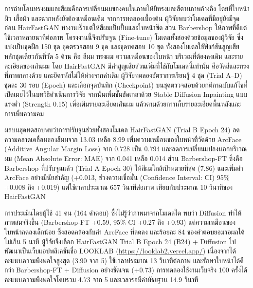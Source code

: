 การถ่ายโอนทรงผมและสีผมคือการเปลี่ยนผมของคนในภาพให้มีทรงและสีตามภาพอ้างอิง
โดยที่ใบหน้า ผิว เสื้อผ้า และฉากหลังยังต้องเหมือนเดิม
จากการทดลองเบื้องต้น ผู้วิจัยพบว่าโมเดลที่มีอยู่ยังมีจุดอ่อน
HairFastGAN ทำงานเร็วแต่ให้สีผมเป็นปื้นและใบหน้าซีด ส่วน Barbershop ให้ภาพที่ดีแต่ใช้เวลาหลายนาทีต่อภาพ
โครงงานนี้จึงปรับจูน (Fine-tune) โมเดลทั้งสองด้วยข้อมูลของผู้วิจัย
ซึ่งแบ่งเป็นชุดฝึก 150 ชุด ชุดตรวจสอบ 9 ชุด และชุดทดสอบ 10 ชุด
ทั้งสองโมเดลใช้ฟังก์ชันสูญเสียหลักชุดเดียวกันที่วัด 5 ด้าน คือ สีผม ทรงผม ความเหมือนของใบหน้า บริเวณที่ต้องคงเดิม และรายละเอียดของเส้นผม
โดย HairFastGAN มีค่าสูญเสียส่วนเพิ่มที่ใช้กับโมเดลนี้เท่านั้น คือวัดสีและทรงที่ภาพกลางด้วย และยึดรหัสไม่ให้ห่างจากค่าเดิม
ผู้วิจัยทดลองอัตราการเรียนรู้ 4 ชุด (Trial A--D) ชุดละ 30 รอบ (Epoch)
และเลือกจุดบันทึก (Checkpoint) บนชุดตรวจสอบด้วยกติกาฉบับแก้ไขที่เปิดเผยไว้ในบทวิธีดำเนินการวิจัย
จากนั้นเพิ่มขั้นขัดเกลาด้วย Stable Diffusion Inpainting แบบแรงต่ำ (Strength 0.15)
เพื่อเติมรายละเอียดเส้นผม แล้วตามด้วยการเก็บรายละเอียดพื้นหลังและการเพิ่มความคม

ผลบนชุดทดสอบพบว่าการปรับจูนช่วยทั้งสองโมเดล
HairFastGAN (Trial B Epoch 24) ลดความคลาดเคลื่อนของสีผมจาก 13.03 เหลือ 8.99
เพิ่มความเหมือนของใบหน้าที่วัดด้วย ArcFace (Additive Angular Margin Loss) จาก 0.728 เป็น 0.794
และลดการเปลี่ยนแปลงนอกบริเวณผม (Mean Absolute Error: MAE) จาก 0.041 เหลือ 0.014
ส่วน Barbershop-FT ซึ่งคือ Barbershop ที่ปรับจูนแล้ว (Trial A Epoch 30) ให้สีผมใกล้เป้าหมายที่สุด (7.86)
และเพิ่มค่า ArcFace อย่างมีนัยสำคัญ (+0.013, ช่วงความเชื่อมั่น (Confidence Interval: CI) 95\% +0.008 ถึง +0.019)
แต่ใช้เวลาประมาณ 657 วินาทีต่อภาพ เทียบกับประมาณ 10 วินาทีของ HairFastGAN

การประเมินโดยผู้ใช้ 41 คน (164 คำตอบ) ซึ่งไม่รู้ว่าภาพมาจากโมเดลใด พบว่า
Diffusion ทำให้ภาพสมจริงขึ้น (Barbershop-FT +0.59, 95\% CI +0.27 ถึง +0.93)
แต่ความเหมือนของใบหน้าลดลงเล็กน้อย ซึ่งสอดคล้องกับค่า ArcFace ที่ลดลง
และร้อยละ 84 ของคำตอบยอมรอผลได้ไม่เกิน 5 นาที
ผู้วิจัยจึงเลือก HairFastGAN Trial B Epoch 24 (B24) + Diffusion ไปพัฒนาเป็นเว็บแอปพลิเคชันชื่อ LOOKLAB (\url{https://looklab2.vercel.app/})
เนื่องจากได้คะแนนความพึงพอใจสูงสุด (3.90 จาก 5) ใช้เวลาประมาณ 13 วินาทีต่อภาพ
และรักษาใบหน้าได้ดีกว่า Barbershop-FT + Diffusion อย่างชัดเจน (+0.73)
การทดลองใช้งานเว็บจริง 100 ครั้งได้คะแนนความพึงพอใจโดยรวม 4.73 จาก 5
และเวลารอมีค่ามัธยฐาน 14.9 วินาที
